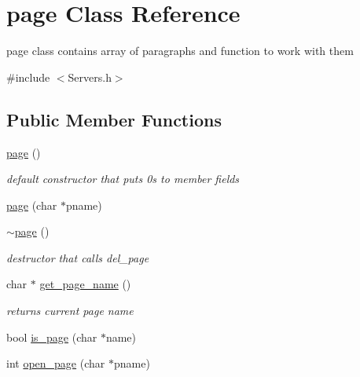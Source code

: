 \hypertarget{classpage}{}\section{page Class Reference}
\label{classpage}


page class contains array of paragraphs and function to work with them  




{\ttfamily \#include $<$Servers.\+h$>$}

\subsection*{Public Member Functions}
\begin{DoxyCompactItemize}
\item 
\mbox{\label{classpage_ab0cfd233d0d3381cf9a7b83e0fddc9ee}} 
\hyperlink{classpage_ab0cfd233d0d3381cf9a7b83e0fddc9ee}{page} ()
\begin{DoxyCompactList}\small\item\em default constructor that puts 0\textquotesingle{}s to member fields \end{DoxyCompactList}\item 
\hyperlink{classpage_a70d21de949a1787fb6db224844b8dce9}{page} (char $\ast$pname)
\item 
\mbox{\label{classpage_a599995602a1df90cd29b26dd955cd93e}} 
\hyperlink{classpage_a599995602a1df90cd29b26dd955cd93e}{$\sim$page} ()
\begin{DoxyCompactList}\small\item\em destructor that calls del\+\_\+page \end{DoxyCompactList}\item 
\mbox{\label{classpage_aa54645bcbff5f2747b65a3eb4bb09b7c}} 
char $\ast$ \hyperlink{classpage_aa54645bcbff5f2747b65a3eb4bb09b7c}{get\+\_\+page\+\_\+name} ()
\begin{DoxyCompactList}\small\item\em returns current page name \end{DoxyCompactList}\item 
bool \hyperlink{classpage_ad9532e48c5e2359694625de13e3825c1}{is\+\_\+page} (char $\ast$name)
\item 
int \hyperlink{classpage_a5eae57fad910ef40d723c1808eeabad9}{open\+\_\+page} (char $\ast$pname)
\item 

\end{DoxyCompactItemize}
